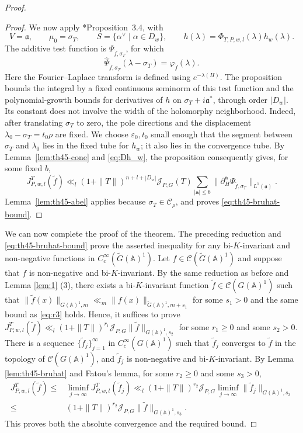 \documentclass[12pt]{amsart}
\theoremstyle{definition}
\theoremstyle{plain}
\theoremstyle{remark}
\def\A{\mathbb{A}}%
\def\inf{\infty}
\newcommand{\fa}{\mathfrak{a}}
\newcommand{\cC}{\mathcal{C}}
\newcommand{\cJ}{\mathcal{J}}
\numberwithin{equation}{section}
\newcommand{\tG}{\widetilde{G}}
\newcommand{\tf}{\tilde{f}}
\newcommand{\sC}{\mathscr{C}}
\begin{document}
\begin{proof}
\begin{proof}
We now apply \cite{FL16}*{Proposition~3.4}, with
\[
 V=\fa,\qquad \mu_0=\sigma_T,\qquad
 S=\{\alpha^\vee\mid \alpha\in D_w\},\qquad
 h(\lambda)=\Phi_{T,P,w,l}(\lambda)h_w(\lambda).
\]
The additive test function is $\Psi_{\tf,\sigma_T}$, for which
\[
 \widehat\Psi_{\tf,\sigma_T}(\lambda-\sigma_T)
 =\varphi_{\tf}(\lambda).
\]
Here the Fourier--Laplace transform is defined using
$e^{-\lambda(H)}$.
The proposition bounds the integral by a fixed continuous seminorm
of this test function and the polynomial-growth bounds for derivatives
of \(h\) on \(\sigma_T+i\fa^*\), through order \(|D_w|\).
Its constant does not involve the width of the holomorphy
neighborhood.
Indeed, after translating \(\sigma_T\) to zero, the pole directions
and the displacement \(\lambda_0-\sigma_T=t_0\rho\) are fixed.
We choose \(\varepsilon_0,t_0\) small enough that the segment between
\(\sigma_T\) and \(\lambda_0\) lies in the fixed tube for \(h_w\);
it also lies in the convergence tube.
By Lemma~\ref{lem:th45-cone} and \eqref{eq:Dh_w}, the proposition consequently gives, for some fixed \(b\),
\[
 J_{P,w,l}^T(\tf)
 \ll_l (1+\|T\|)^{n+l+|D_w|}\cJ_{P,G}(T)
       \sum_{|\mathbf a|\leq b}
       \|\partial_H^{\mathbf a}\Psi_{\tf,\sigma_T}\|_{L^1(\fa)}.
\]
Lemma~\ref{lem:th45-abel} applies because
$\sigma_T\in\sC_\rho$, and proves
\eqref{eq:th45-bruhat-bound}.
\end{proof}

We can now complete the proof of the theorem.
The preceding reduction and \eqref{eq:th45-bruhat-bound} prove the asserted inequality for
any bi-$K$-invariant and non-negative functions in $C^\inf_c(\tG(\A)^1)$.
Let $f\in\cC(\tG(\A)^1)$ and suppose that $f$ is non-negative and bi-$K$-invariant. 
By the same reduction as before and Lemma \ref{lem:1} (3), 
there exists a bi-$K$-invariant function $\tf\in \cC(G(\A)^1)$ such that $\|\tf(x)\|_{G(\A)^1,m} \ll_m  \|f(x)\|_{\tG(\A)^1,m+s_1}$ for some $s_1>0$ and the same bound as \eqref{eq:r3} holds. 
Hence, it suffices to prove $J^T_{P,w,l}(\tf)\ll_l (1+\|T\|)^{r_1} \cJ_{P,G}\|\tf\|_{G(\A)^1,s_2}$ for some $r_1\ge 0$ and some $s_2>0$. 
There is a sequence $\{\tf_j\}_{j=1}^\inf$ in $C^\inf_c(G(\A)^1)$ such that $\tf_j$ converges to $\tf$ in the topology of $\cC(G(\A)^1)$, and $\tf_j$ is non-negative and bi-$K$-invariant. 
By Lemma \ref{lem:th45-bruhat} and Fatou's lemma, for some $r_2\ge0$ and some $s_3>0$, 
\begin{align*}
J^T_{P,w,l}(\tf)\le&  \liminf_{j\to \inf} J^T_{P,w,l}(\tf_j)\ll_l (1+\|T\|)^{r_2} \cJ_{P,G}\liminf_{j\to \inf} \|\tf_j\|_{G(\A)^1,s_3} \\
\le & (1+\|T\|)^{r_2} \cJ_{P,G} \|\tf\|_{G(\A)^1,s_3}.    
\end{align*}
This proves both the absolute convergence and the required bound.
\end{proof}
\end{document}
